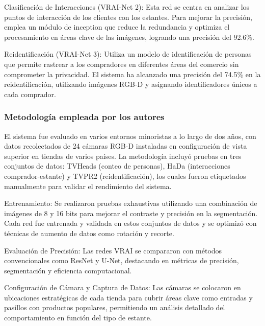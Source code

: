 Clasificación de Interacciones (VRAI-Net 2): Esta red se centra en analizar los puntos de interacción de los clientes con los estantes. Para mejorar la precisión, emplea un módulo de inception que reduce la redundancia y optimiza el procesamiento en áreas clave de las imágenes, logrando una precisión del 92.6\%.

Reidentificación (VRAI-Net 3): Utiliza un modelo de identificación de personas que permite rastrear a los compradores en diferentes áreas del comercio sin comprometer la privacidad. El sistema ha alcanzado una precisión del 74.5\% en la reidentificación, utilizando imágenes RGB-D y asignando identificadores únicos a cada comprador.




\subsubsection{Metodología empleada por los autores}
El sistema fue evaluado en varios entornos minoristas a lo largo de dos años, con datos recolectados de 24 cámaras RGB-D instaladas en configuración de vista superior en tiendas de varios países. La metodología incluyó pruebas en tres conjuntos de datos: TVHeads (conteo de personas), HaDa (interacciones comprador-estante) y TVPR2 (reidentificación), los cuales fueron etiquetados manualmente para validar el rendimiento del sistema.

Entrenamiento: Se realizaron pruebas exhaustivas utilizando una combinación de imágenes de 8 y 16 bits para mejorar el contraste y precisión en la segmentación. Cada red fue entrenada y validada en estos conjuntos de datos y se optimizó con técnicas de aumento de datos como rotación y recorte.

Evaluación de Precisión: Las redes VRAI se compararon con métodos convencionales como ResNet y U-Net, destacando en métricas de precisión, segmentación y eficiencia computacional.

Configuración de Cámara y Captura de Datos: Las cámaras se colocaron en ubicaciones estratégicas de cada tienda para cubrir áreas clave como entradas y pasillos con productos populares, permitiendo un análisis detallado del comportamiento en función del tipo de estante.






